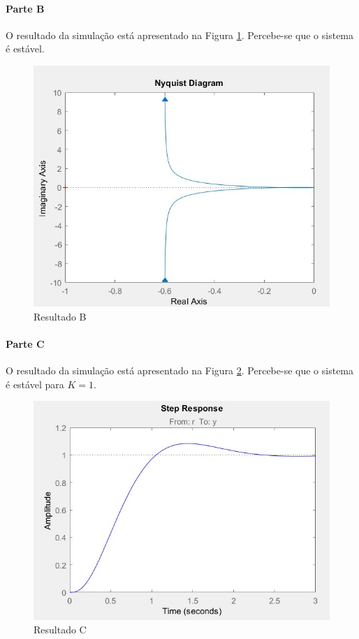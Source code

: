 \documentclass[
]{book}
\theoremstyle{definition}
\theoremstyle{definition}
\theoremstyle{definition}
\theoremstyle{remark}
\begin{document}
\hypertarget{parte-b-13}{%
\paragraph{Parte B}\label{parte-b-13}}

O resultado da simulação está apresentado na Figura \ref{fig:fig10RA2}. Percebe-se que o sistema é estável.

\begin{figure}

{\centering \includegraphics[width=0.5\linewidth]{Imagens/Lab10/Resolução/fig2} 

}

\caption{Resultado B}\label{fig:fig10RA2}
\end{figure}

\hypertarget{parte-c-9}{%
\paragraph{Parte C}\label{parte-c-9}}

O resultado da simulação está apresentado na Figura \ref{fig:fig10RA3}. Percebe-se que o sistema é estável para \(K=1\).

\begin{figure}

{\centering \includegraphics[width=0.5\linewidth]{Imagens/Lab10/Resolução/fig3} 

}

\caption{Resultado C}\label{fig:fig10RA3}
\end{figure}
\end{document}
